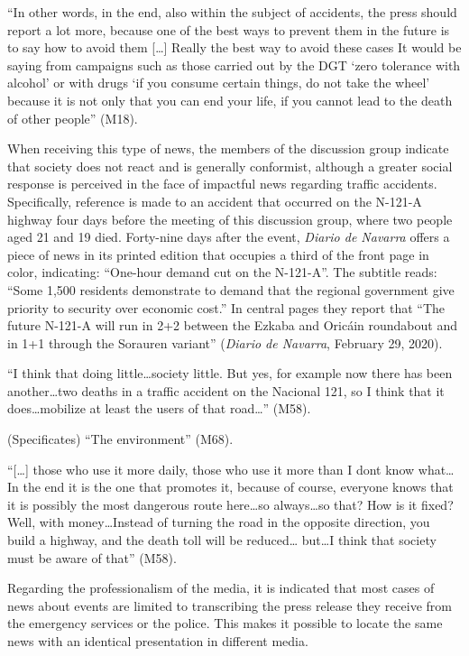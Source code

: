 \enquote{In other words, in the end, also within the subject of accidents, the
press should report a lot more, because one of the best ways to prevent
them in the future is to say how to avoid them [\ldots] Really the best
way to avoid these cases It would be saying from campaigns such as those
carried out by the DGT \enquote{zero tolerance with alcohol} or with drugs \enquote{if
you consume certain things, do not take the wheel} because it is not
only that you can end your life, if you cannot lead to the death of
other people} (M18).

When receiving this type of news, the members of the discussion group
indicate that society does not react and is generally conformist,
although a greater social response is perceived in the face of impactful
news regarding traffic accidents. Specifically, reference is made to an
accident that occurred on the N-121-A highway four days before the
meeting of this discussion group, where two people aged 21 and 19 died.
Forty-nine days after the event, \emph{Diario de Navarra} offers a piece
of news in its printed edition that occupies a third of the front page
in color, indicating: \enquote{One-hour demand cut on the N-121-A}. The
subtitle reads: \enquote{Some 1,500 residents demonstrate to demand that the
regional government give priority to security over economic cost.} In
central pages they report that \enquote{The future N-121-A will run in 2+2
between the Ezkaba and Oricáin roundabout and in 1+1 through the
Sorauren variant} (\emph{Diario de Navarra}, February 29, 2020).

\enquote{I think that doing little\ldots society little. But yes, for example
now there has been another\ldots two deaths in a traffic accident on
the Nacional 121, so I think that it does\ldots mobilize at least the
users of that road\ldots} (M58).

(Specificates) \enquote{The environment} (M68).

\enquote{[\ldots] those who use it more daily, those who use it more than I
don\textquotesingle t know what\ldots In the end it is the one that
promotes it, because of course, everyone knows that it is possibly the
most dangerous route here\ldots so always\ldots so that? How is it
fixed? Well, with money\ldots Instead of turning the road in the opposite
direction, you build a highway, and the death toll will be reduced\ldots
but\ldots I think that society must be aware of that} (M58).

Regarding the professionalism of the media, it is indicated that most
cases of news about events are limited to transcribing the press release
they receive from the emergency services or the police. This makes it
possible to locate the same news with an identical presentation in
different media.

